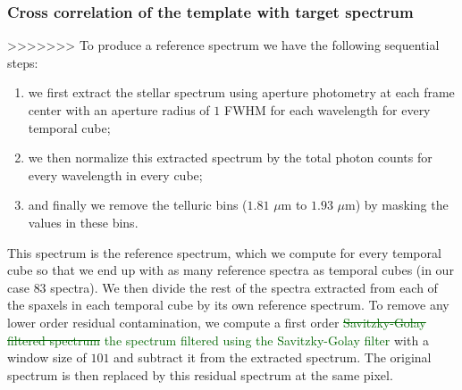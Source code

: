 \documentclass{aa}
\newcommand{\newchange}[1]{\textcolor{darkgreen}{#1}}
\begin{document}
{\subsubsection{Cross correlation of the template with target spectrum}\label{sec: CC algorithm}
>>>>>>>
To produce a reference spectrum we have the following sequential steps:
\begin{enumerate}
<<<<<<<
=======
Cross correlation is a method used to compare two different spectra.
In this paper, such a comparison is made between an extracted spectrum and the BT-SETTL template spectrum, which is downsampled and broadened to match the SINFONI spectra (same as when it was injected) and then mean-subtracted as described above.
Cross correlation is the result of introducing a small velocity shift between the model and the extracted spectrum and computing the product of the two.
This product is the cross correlation coefficient and it is computed for every velocity shift.
The cross correlation $\mathcal{C}$ between the model template $M_{\lambda}$ and the extracted spectrum ($F_{\lambda}$) at different velocities $v$ is thus given by:
>>>>>>>
    \item we first extract the stellar spectrum using aperture photometry at each frame center with an aperture radius of $1$ FWHM for each wavelength for every temporal cube;
    \item we then normalize this extracted spectrum by the total photon counts for every wavelength in every cube;
    \item and finally we remove the telluric bins ($1.81$ $\mu$m to $1.93$ $\mu$m) by masking the values in these bins.
\end{enumerate}
This spectrum is the reference spectrum, which we compute for every temporal cube so that we end up with as many reference spectra as temporal cubes (in our case $83$ spectra).
We then divide the rest of the spectra extracted from each of the spaxels in each temporal cube by its own reference spectrum.
To remove any lower order residual contamination, we compute a first order \newchange{\sout{Savitzky-Golay filtered spectrum } the spectrum filtered using the Savitzky-Golay filter \citep{1964SavitzkyGolay}} with a window size of $101$ and subtract it from the extracted spectrum. The original spectrum is then replaced by this residual spectrum at the same pixel.

}
\end{document}
